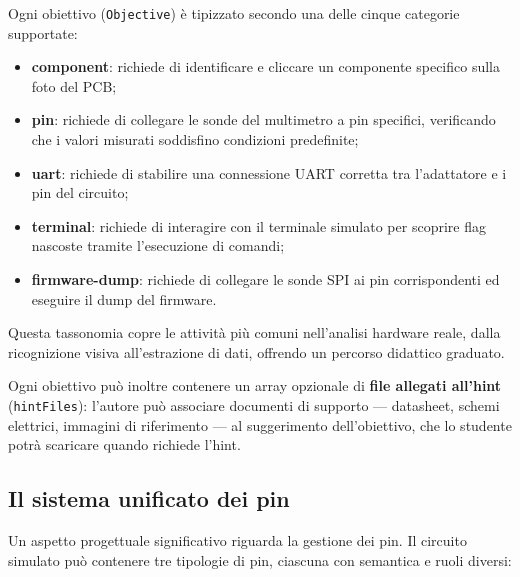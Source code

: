 Ogni obiettivo (\texttt{Objective}) è tipizzato secondo una delle cinque categorie supportate:

\begin{itemize}
    \item \textbf{component}: richiede di identificare e cliccare un componente specifico sulla foto del PCB;
    \item \textbf{pin}: richiede di collegare le sonde del multimetro a pin specifici, verificando che i valori misurati soddisfino condizioni predefinite;
    \item \textbf{uart}: richiede di stabilire una connessione UART corretta tra l'adattatore e i pin del circuito;
    \item \textbf{terminal}: richiede di interagire con il terminale simulato per scoprire flag nascoste tramite l'esecuzione di comandi;
    \item \textbf{firmware-dump}: richiede di collegare le sonde SPI ai pin corrispondenti ed eseguire il dump del firmware.
\end{itemize}

Questa tassonomia copre le attività più comuni nell'analisi hardware reale, dalla ricognizione visiva all'estrazione di dati, offrendo un percorso didattico graduato.

Ogni obiettivo può inoltre contenere un array opzionale di \textbf{file allegati all'hint} (\texttt{hintFiles}): l'autore può associare documenti di supporto --- datasheet, schemi elettrici, immagini di riferimento --- al suggerimento dell'obiettivo, che lo studente potrà scaricare quando richiede l'hint.

\subsection{Il sistema unificato dei pin}

Un aspetto progettuale significativo riguarda la gestione dei pin. Il circuito simulato può contenere tre tipologie di pin, ciascuna con semantica e ruoli diversi:

